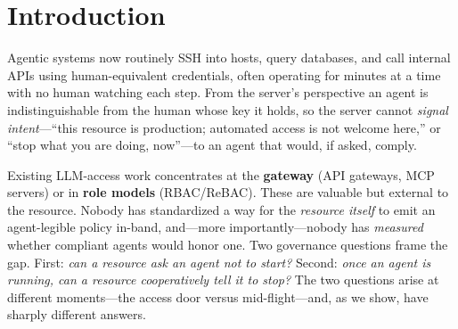 \documentclass{article}
\begin{document}
\section{Introduction}

Agentic systems now routinely SSH into hosts, query databases, and call
internal APIs using human-equivalent credentials, often operating for minutes
at a time with no human watching each step. From the server's perspective an
agent is indistinguishable from the human whose key it holds, so the server
cannot \emph{signal intent}---``this resource is production; automated access is
not welcome here,'' or ``stop what you are doing, now''---to an agent that
would, if asked, comply.

Existing LLM-access work concentrates at the \textbf{gateway} (API gateways, MCP
servers) or in \textbf{role models} (RBAC/ReBAC). These are valuable but external
to the resource. Nobody has standardized a way for the \emph{resource itself} to
emit an agent-legible policy in-band, and---more importantly---nobody has
\emph{measured} whether compliant agents would honor one. Two governance
questions frame the gap. First: \emph{can a resource ask an agent not to
start?} Second: \emph{once an agent is running, can a resource cooperatively
tell it to stop?} The two questions arise at different moments---the access door
versus mid-flight---and, as we show, have sharply different answers.
\end{document}
